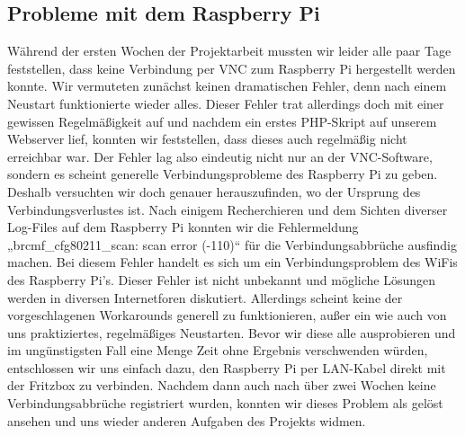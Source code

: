 \subsection{Probleme mit dem Raspberry Pi}
Während der ersten Wochen der Projektarbeit mussten wir leider alle paar Tage feststellen, dass keine Verbindung per VNC zum Raspberry Pi hergestellt werden konnte. Wir vermuteten zunächst keinen dramatischen Fehler, denn nach einem Neustart funktionierte wieder alles. Dieser Fehler trat allerdings doch mit einer gewissen Regelmäßigkeit auf und nachdem ein erstes PHP-Skript auf unserem Webserver lief, konnten wir feststellen, dass dieses auch regelmäßig nicht erreichbar war. Der Fehler lag also eindeutig nicht nur an der VNC-Software, sondern es scheint generelle Verbindungsprobleme des Raspberry Pi zu geben.
Deshalb versuchten wir doch genauer herauszufinden, wo der Ursprung des Verbindungsverlustes ist. Nach einigem Recherchieren und dem Sichten diverser Log-Files auf dem Raspberry Pi konnten wir die Fehlermeldung „brcmf\_cfg80211\_scan: scan error (-110)“ für die Verbindungsabbrüche ausfindig machen. Bei diesem Fehler handelt es sich um ein Verbindungsproblem des WiFis des Raspberry Pi’s. Dieser Fehler ist nicht unbekannt und mögliche Lösungen werden in diversen Internetforen diskutiert. Allerdings scheint keine der vorgeschlagenen Workarounds generell zu funktionieren, außer ein wie auch von uns praktiziertes, regelmäßiges Neustarten. Bevor wir diese alle ausprobieren und im ungünstigsten Fall eine Menge Zeit ohne Ergebnis verschwenden würden, entschlossen wir uns einfach dazu, den Raspberry Pi per LAN-Kabel direkt mit der Fritzbox zu verbinden. Nachdem dann auch nach über zwei Wochen keine Verbindungsabbrüche registriert wurden, konnten wir dieses Problem als gelöst ansehen und uns wieder anderen Aufgaben des Projekts widmen.
\\
